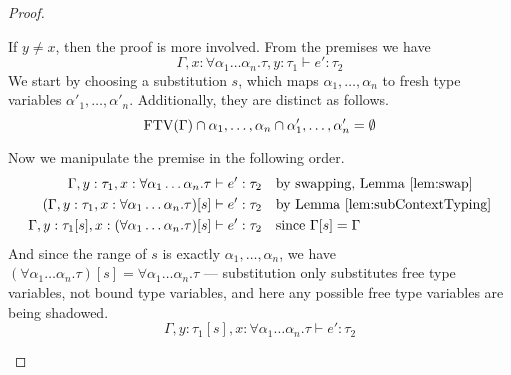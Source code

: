\begin{proof}
\begin{description}
    If $y \ne x$, then the proof is more involved. From the premises
    we have
    \[\Gamma , x : \forall \alpha_1\ldots\alpha_n . \tau , y : \tau_1 \vdash e' : \tau_2\]
    We start by choosing a substitution $s$, which maps $\alpha_1 , \ldots, \alpha_n$
    to fresh type variables $\alpha'_1, \ldots,\alpha'_n$. Additionally, they are
    distinct as follows.
    \[\operatorname{FTV}(\Gamma) \cap \alpha_1,\ldots,\alpha_n \cap \alpha'_1,\ldots,\alpha'_n = \emptyset\]

    Now we manipulate the premise in the following order.
    \begin{align*}
      \Gamma , y : \tau_1 , x : \forall\alpha_1\ldots\alpha_n . \tau &\vdash e' : \tau_2 && \text{by swapping,
                                                   Lemma~\ref{lem:swap}}
      \\
      (\Gamma , y : \tau_1 , x : \forall\alpha_1\ldots\alpha_n . \tau)[s] &\vdash e' : \tau_2 && \text{by
                                                     Lemma~\ref{lem:subContextTyping}}
      \\
      \Gamma , y : \tau_1[s] , x : (\forall\alpha_1\ldots\alpha_n . \tau)[s] &\vdash e' : \tau_2 &&
                                                            \text{since
                                                            } \Gamma[s] = \Gamma
    \end{align*}
    And since the range of $s$ is exactly $\alpha_1,\ldots,\alpha_n$, we have
    $(\forall \alpha_1\ldots\alpha_n . \tau)[s] = \forall \alpha_1\ldots\alpha_n . \tau$ --- substitution only
    substitutes free type variables, not bound type variables, and
    here any possible free type variables are being shadowed.
    \begin{equation}
      \Gamma , y : \tau_1[s] , x : \forall \alpha_1\ldots\alpha_n . \tau \vdash e' : \tau_2
      \label{eq:substAbs2}
    \end{equation}


\end{description}
\end{proof}
